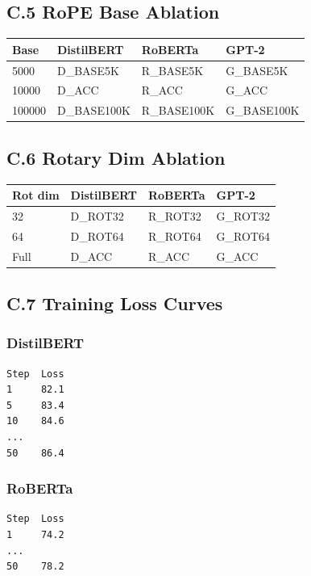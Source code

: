 \subsection{C.5 RoPE Base Ablation}

\begin{table}[H]
\centering
\small
\begin{tabular}{llll}
\toprule
\textbf{Base} & \textbf{DistilBERT} & \textbf{RoBERTa} & \textbf{GPT-2} \\
\midrule
5000 & {{D\_BASE5K}} & {{R\_BASE5K}} & {{G\_BASE5K}} \\
10000 & {{D\_ACC}} & {{R\_ACC}} & {{G\_ACC}} \\
100000 & {{D\_BASE100K}} & {{R\_BASE100K}} & {{G\_BASE100K}} \\
\bottomrule
\end{tabular}
\end{table}

\subsection{C.6 Rotary Dim Ablation}

\begin{table}[H]
\centering
\small
\begin{tabular}{llll}
\toprule
\textbf{Rot dim} & \textbf{DistilBERT} & \textbf{RoBERTa} & \textbf{GPT-2} \\
\midrule
32 & {{D\_ROT32}} & {{R\_ROT32}} & {{G\_ROT32}} \\
64 & {{D\_ROT64}} & {{R\_ROT64}} & {{G\_ROT64}} \\
Full & {{D\_ACC}} & {{R\_ACC}} & {{G\_ACC}} \\
\bottomrule
\end{tabular}
\end{table}

\subsection{C.7 Training Loss Curves}

\subsubsection{DistilBERT}
\begin{lstlisting}
Step  Loss
1     82.1
5     83.4
10    84.6
...
50    86.4
\end{lstlisting}

\subsubsection{RoBERTa}
\begin{lstlisting}
Step  Loss
1     74.2
...
50    78.2
\end{lstlisting}

